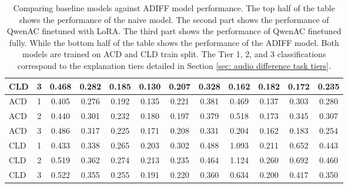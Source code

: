 \begin{table*}[!ht]
\begin{tabular}{lccccccccccc}
CLD & 3 & 0.468 & 0.282 & 0.185 & 0.130 & 0.207 & 0.328 & 0.162 & 0.182 & 0.172 & 0.235 \\ \midrule
ACD & 1 & 0.405 & 0.276 & 0.192 & 0.135 & 0.221 & 0.381 & 0.469 & 0.137 & 0.303 & 0.280 \\
ACD & 2 & 0.440 & 0.301 & 0.232 & 0.180 & 0.197 & 0.379 & 0.518 & 0.173 & 0.345 & 0.307 \\
ACD & 3 & 0.486 & 0.317 & 0.225 & 0.171 & 0.208 & 0.331 & 0.204 & 0.162 & 0.183 & 0.254 \\
CLD & 1 & 0.433 & 0.338 & 0.265 & 0.203 &  0.302 & 0.488 & 1.093 & 0.211 & 0.652 & 0.443 \\
CLD & 2 & 0.519 & 0.362 & 0.274 & 0.213 & 0.235 & 0.464 & 1.124 & 0.260 & 0.692 & 0.460 \\
CLD & 3 & 0.522 & 0.355 & 0.255 & 0.191 & 0.220 & 0.360 & 0.634 & 0.200 & 0.417 & 0.350 \\ \bottomrule
\end{tabular} 
\caption{\label{table: appendix audio difference results} 
\small Comparing baseline models against ADIFF model performance. The top half of the table shows the performance of the naive model. The second part shows the performance of QwenAC finetuned with LoRA. The third part shows the performance of QwenAC finetuned fully. While the bottom half of the table shows the performance of the ADIFF model. Both models are trained on ACD and CLD train split. The Tier 1, 2, and 3 classifications correspond to the explanation tiers detailed in Section \ref{sec: audio difference task tiers}. 
}
\end{table*}

